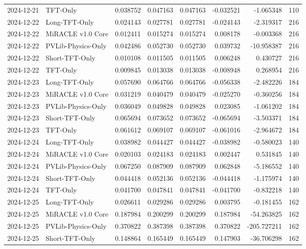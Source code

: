 \begin{tabular}{llrrrrrr}
2024-12-21 & TFT-Only & 0.038752 & 0.047163 & 0.047163 & -0.032521 & -1.065348 & 110 \\
2024-12-22 & Long-TFT-Only & 0.024143 & 0.027781 & 0.027781 & -0.024143 & -2.319317 & 216 \\
2024-12-22 & MiRACLE v1.0 Core & 0.012411 & 0.015274 & 0.015274 & 0.008178 & -0.003368 & 216 \\
2024-12-22 & PVLib-Physics-Only & 0.042486 & 0.052730 & 0.052730 & 0.039732 & -10.958387 & 216 \\
2024-12-22 & Short-TFT-Only & 0.010108 & 0.011505 & 0.011505 & 0.006248 & 0.430727 & 216 \\
2024-12-22 & TFT-Only & 0.009845 & 0.013038 & 0.013038 & -0.008948 & 0.268954 & 216 \\
2024-12-23 & Long-TFT-Only & 0.057690 & 0.064766 & 0.064766 & -0.056338 & -2.482226 & 184 \\
2024-12-23 & MiRACLE v1.0 Core & 0.031219 & 0.040479 & 0.040479 & -0.025270 & -0.360256 & 184 \\
2024-12-23 & PVLib-Physics-Only & 0.036049 & 0.049828 & 0.049828 & 0.023085 & -1.061202 & 184 \\
2024-12-23 & Short-TFT-Only & 0.065694 & 0.073652 & 0.073652 & -0.065694 & -3.503371 & 184 \\
2024-12-23 & TFT-Only & 0.061612 & 0.069107 & 0.069107 & -0.061016 & -2.964672 & 184 \\
2024-12-24 & Long-TFT-Only & 0.038982 & 0.044427 & 0.044427 & -0.038982 & -0.580023 & 140 \\
2024-12-24 & MiRACLE v1.0 Core & 0.020103 & 0.024183 & 0.024183 & 0.002447 & 0.531845 & 140 \\
2024-12-24 & PVLib-Physics-Only & 0.067250 & 0.087909 & 0.087909 & 0.062848 & -5.186552 & 140 \\
2024-12-24 & Short-TFT-Only & 0.044418 & 0.052136 & 0.052136 & -0.044418 & -1.175974 & 140 \\
2024-12-24 & TFT-Only & 0.041700 & 0.047841 & 0.047841 & -0.041700 & -0.832218 & 140 \\
2024-12-25 & Long-TFT-Only & 0.026611 & 0.029286 & 0.029286 & 0.003795 & -0.181455 & 162 \\
2024-12-25 & MiRACLE v1.0 Core & 0.187984 & 0.200299 & 0.200299 & 0.187984 & -54.263825 & 162 \\
2024-12-25 & PVLib-Physics-Only & 0.370822 & 0.387398 & 0.387398 & 0.370822 & -205.727211 & 162 \\
2024-12-25 & Short-TFT-Only & 0.148864 & 0.165449 & 0.165449 & 0.147903 & -36.706298 & 162 \\

\end{tabular}
